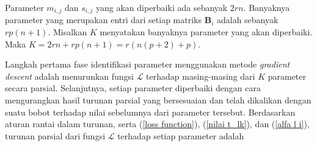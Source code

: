 \noindent Parameter $m_{i,j}$ dan $s_{i,j}$ yang akan diperbaiki ada sebanyak $2rn$. Banyaknya parameter yang merupakan entri dari setiap matriks $\mathbf{B}_i$ adalah sebanyak $rp(n+1)$. Misalkan $K$ menyatakan banyaknya parameter yang akan diperbaiki. Maka $K = 2rn+rp(n+1) = r(n(p+2)+p)$.

\noindent Langkah pertama fase identifikasi parameter menggunakan metode \emph{gradient descent} adalah menurunkan fungsi $\mathcal{L}$ terhadap masing-masing dari $K$ parameter secara parsial. Selanjutnya, setiap parameter diperbaiki dengan cara mengurangkan hasil turunan parsial yang bersesuaian dan telah dikalikan dengan suatu bobot terhadap nilai sebelumnya dari parameter tersebut. Berdasarkan aturan rantai dalam turunan, serta (\ref{loss function}), (\ref{nilai t_lk}), dan (\ref{alfa l i}), turunan parsial dari fungsi $\mathcal{L}$ terhadap setiap parameter adalah
\begingroup
\allowdisplaybreaks

